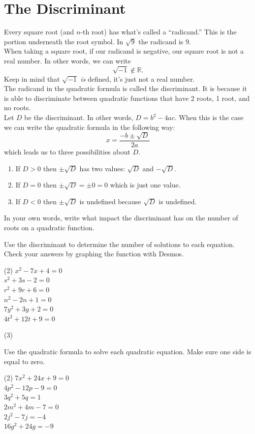 \documentclass[12pt,fleqn]{book}
\newcommand{\prb}[1]{\begin{Exercise}#1\end{Exercise}}
\newcommand{\sol}[1]{\begin{Answer}#1\end{Answer}}
\begin{document}
\section*{The Discriminant}
Every square root (and $n$-th root) has what's called a ``radicand.''  This is the portion underneath the root symbol.  In $\sqrt9$ the radicand is 9.
\\[1em]
When taking a square root, if our radicand is negative, our square root is not a real number.  In other words, we can write
\[\sqrt{-1}\not\in\mathbb R.\]
Keep in mind that $\sqrt{-1}$ \emph{is} defined, it's just not a real number.
\\[1em]
The radicand in the quadratic formula is called the discriminant.  It is because it is able to discriminate between quadratic functions that have 2 roots, 1 root, and no roots.
\\[1em]
Let $D$ be the discriminant.  In other words, $D=b^2-4ac$.  When this is the case we can write the quadratic formula in the following way:
\[x=\frac{-b\pm \sqrt{D}}{2a}\]
which leads us to three possibilities about $D$.
\begin{enumerate}
	\item If $D>0$ then $\pm \sqrt{D}$ has two values: $\sqrt D$ and $-\sqrt D$.
	\item If $D=0$ then $\pm \sqrt{D}=\pm 0 = 0$ which is just one value.
	\item If $D<0$ then $\pm \sqrt{D}$ is undefined because $\sqrt{D}$ is undefined.
\end{enumerate}
In your own words, write what impact the discriminant has on the number of roots on a quadratic function.

\prb{Use the discriminant to determine the
	number of solutions to each equation.  Check your answers by graphing the function with Desmos.
	\begin{tasks}(2)
		\task $x^2-7 x+4=0$ \\[3em]
		\task $s^2+3 s-2=0$ \\[3em]
		\task $r^2+9 r+6=0$ \\[3em]
		\task $n^2-2 n+1=0$ \\[3em]
		\task $7 y^2+3 y+2=0$ \\[3em]
		\task $4 t^2+12 t+9=0$ \\[3em]
	\end{tasks}
}

\sol{
	\begin{tasks}(3)
		\task 2
		\task 2
		\task 0
		\task 1
	\end{tasks}
}
\clearpage
\prb{Use the quadratic formula to solve each
	quadratic equation.  Make sure one side is equal to zero.
	\begin{tasks}(2)
		\task $7 x^2+24 x+9=0$\\[5em]
		\task $4 p^2-12 p-9=0$\\[5em]
		\task $3 q^2+5 q=1$\\[5em]
		\task $2 m^2+4 m-7=0$\\[5em]
		\task $2 j^2-7 j=-4$\\[5em]
		\task $16 g^2+24 g=-9$\\[5em]
	\end{tasks}
}
\end{document}
